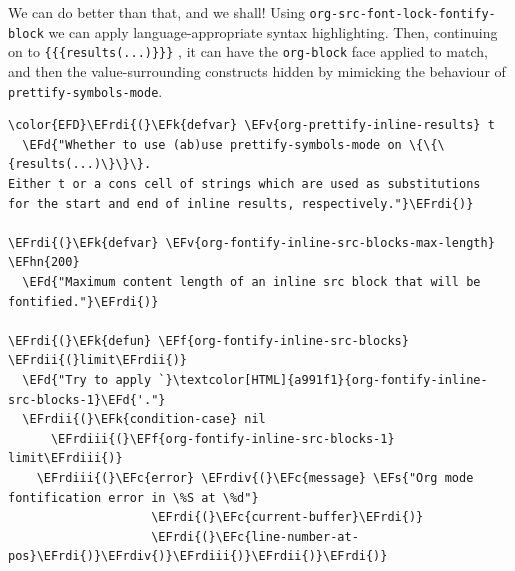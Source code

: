 \documentclass{scrartcl}
\newcommand{\EFk}[1]{\textcolor{EFk}{#1}} %
\newcommand{\EFd}[1]{\textcolor{EFd}{#1}} %
\newcommand{\EFs}[1]{\textcolor{EFs}{#1}} %
\newcommand{\EFc}[1]{\textcolor{EFc}{#1}} %
\newcommand{\EFv}[1]{\textcolor{EFv}{#1}} %
\newcommand{\EFf}[1]{\textcolor{EFf}{#1}} %
\newcommand{\EFhn}[1]{#1} %
\newcommand{\EFrdi}[1]{#1} %
\newcommand{\EFrdii}[1]{#1} %
\newcommand{\EFrdiii}[1]{#1} %
\newcommand{\EFrdiv}[1]{#1} %
\begin{document}
We can do better than that, and we shall! Using \texttt{org-src-font-lock-fontify-block}
we can apply language-appropriate syntax highlighting. Then, continuing on to
\texttt{\{\{\{results(...)\}\}\}} , it can have the \texttt{org-block} face applied to match, and then
the value-surrounding constructs hidden by mimicking the behaviour of
\texttt{prettify-symbols-mode}.

\begin{Code}
\begin{Verbatim}[]
\color{EFD}\EFrdi{(}\EFk{defvar} \EFv{org-prettify-inline-results} t
  \EFd{"Whether to use (ab)use prettify-symbols-mode on \{\{\{results(...)\}\}\}.
Either t or a cons cell of strings which are used as substitutions
for the start and end of inline results, respectively."}\EFrdi{)}

\EFrdi{(}\EFk{defvar} \EFv{org-fontify-inline-src-blocks-max-length} \EFhn{200}
  \EFd{"Maximum content length of an inline src block that will be fontified."}\EFrdi{)}

\EFrdi{(}\EFk{defun} \EFf{org-fontify-inline-src-blocks} \EFrdii{(}limit\EFrdii{)}
  \EFd{"Try to apply `}\textcolor[HTML]{a991f1}{org-fontify-inline-src-blocks-1}\EFd{'."}
  \EFrdii{(}\EFk{condition-case} nil
      \EFrdiii{(}\EFf{org-fontify-inline-src-blocks-1} limit\EFrdiii{)}
    \EFrdiii{(}\EFc{error} \EFrdiv{(}\EFc{message} \EFs{"Org mode fontification error in \%S at \%d"}
                    \EFrdi{(}\EFc{current-buffer}\EFrdi{)}
                    \EFrdi{(}\EFc{line-number-at-pos}\EFrdi{)}\EFrdiv{)}\EFrdiii{)}\EFrdii{)}\EFrdi{)}


\end{Verbatim}
\end{Code}
\end{document}
